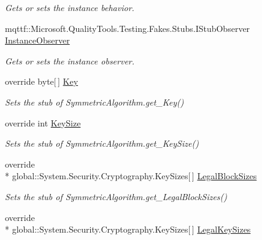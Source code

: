 \begin{DoxyCompactItemize}
\begin{DoxyCompactList}\small\item\em Gets or sets the instance behavior.\end{DoxyCompactList}\item 
mqttf\-::\-Microsoft.\-Quality\-Tools.\-Testing.\-Fakes.\-Stubs.\-I\-Stub\-Observer \hyperlink{class_system_1_1_security_1_1_cryptography_1_1_fakes_1_1_stub_aes_a26b10d541c4963b5e0d13d0e45307592}{Instance\-Observer}
\begin{DoxyCompactList}\small\item\em Gets or sets the instance observer.\end{DoxyCompactList}\item 
override byte\mbox{[}$\,$\mbox{]} \hyperlink{class_system_1_1_security_1_1_cryptography_1_1_fakes_1_1_stub_aes_a43ec6f63fb564f3a457371ad89427b70}{Key}
\begin{DoxyCompactList}\small\item\em Sets the stub of Symmetric\-Algorithm.\-get\-\_\-\-Key()\end{DoxyCompactList}\item 
override int \hyperlink{class_system_1_1_security_1_1_cryptography_1_1_fakes_1_1_stub_aes_a5f745d4ccdbc0be88293aade6b3b1b3a}{Key\-Size}
\begin{DoxyCompactList}\small\item\em Sets the stub of Symmetric\-Algorithm.\-get\-\_\-\-Key\-Size()\end{DoxyCompactList}\item 
override \\*
global\-::\-System.\-Security.\-Cryptography.\-Key\-Sizes\mbox{[}$\,$\mbox{]} \hyperlink{class_system_1_1_security_1_1_cryptography_1_1_fakes_1_1_stub_aes_a62dffcd36e18b376ab18b431f6b54520}{Legal\-Block\-Sizes}
\begin{DoxyCompactList}\small\item\em Sets the stub of Symmetric\-Algorithm.\-get\-\_\-\-Legal\-Block\-Sizes()\end{DoxyCompactList}\item 
override \\*
global\-::\-System.\-Security.\-Cryptography.\-Key\-Sizes\mbox{[}$\,$\mbox{]} \hyperlink{class_system_1_1_security_1_1_cryptography_1_1_fakes_1_1_stub_aes_a79fde93a2090b090d485996aa56aebb9}{Legal\-Key\-Sizes}

\end{DoxyCompactItemize}
